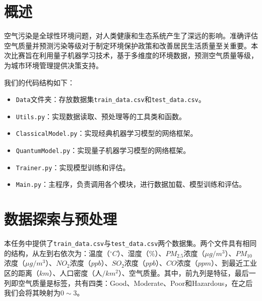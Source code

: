 \documentclass[10pt,a4paper,twoside]{article}
\numberwithin{figure}{section}%
\numberwithin{table}{section}%
\begin{document}

\setlength{\abovedisplayskip}{2pt}%
\setlength{\belowdisplayskip}{2pt}%


\section{概述}

空气污染是全球性环境问题，对人类健康和生态系统产生了深远的影响。准确评估空气质量并预测污染等级对于制定环境保护政策和改善居民生活质量至关重要。本次比赛旨在利用量子机器学习技术，基于多维度的环境数据，预测空气质量等级，为城市环境管理提供决策支持。

我们的代码结构如下：

\begin{itemize}
	\item \texttt{Data}文件夹：存放数据集\texttt{train\_data.csv}和\texttt{test\_data.csv}。
	\item \texttt{Utils.py}：实现数据读取、预处理等的工具类和函数。
	\item \texttt{ClassicalModel.py}：实现经典机器学习模型的网络框架。
	\item \texttt{QuantumModel.py}：实现量子机器学习模型的网络框架。
	\item \texttt{Trainer.py}：实现模型训练和评估。
	\item \texttt{Main.py}：主程序，负责调用各个模块，进行数据加载、模型训练和评估。
\end{itemize}


\section{数据探索与预处理}

本任务中提供了\texttt{train\_data.csv}与\texttt{test\_data.csv}两个数据集。两个文件具有相同的结构，从左到右依次为：温度（${}^\circ C$）、湿度（\%）、$PM_{2.5}$浓度（$\mu g/m^3$）、$PM_{10}$浓度（$\mu g/m^3$）、$NO_2$浓度（$ppb$）、$SO_2$浓度（$ppb$）、$CO$浓度（$ppm$）、到最近工业区的距离（$km$）、人口密度（人$/$$km^2$）、空气质量。其中，前九列是特征，最后一列即空气质量是标签，共有四类：Good、Moderate、Poor和Hazardous，在之后我们会将其映射为$0\sim3$。
\end{document}
